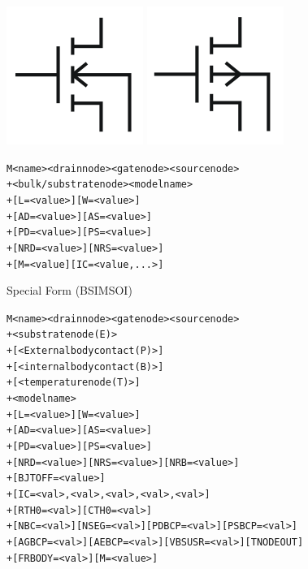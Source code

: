 


\begin{Device}\label{M_DEVICE}

\symbol
{\includegraphics{nmosSymbol}}
{\includegraphics{pmosSymbol}}

\device
\begin{alltt}
M<name> <drain node> <gate node> <source node>
+ <bulk/substrate node> <model name>
+ [L=<value>] [W=<value>]
+ [AD=<value>] [AS=<value>]
+ [PD=<value>] [PS=<value>]
+ [NRD=<value>] [NRS=<value>]
+ [M=<value] [IC=<value, ...>]
\end{alltt}

\vbox{\hrulefill}
\item[Special Form (BSIMSOI)]
\begin{alltt}
M<name> <drain node> <gate node> <source node>
+ <substrate node (E)>
+ [<External body contact (P)>]
+ [<internal body contact (B)>]
+ [<temperature node (T)>]
+ <model name>
+ [L=<value>] [W=<value>]
+ [AD=<value>] [AS=<value>]
+ [PD=<value>] [PS=<value>]
+ [NRD=<value>] [NRS=<value>] [NRB=<value>]
+ [BJTOFF=<value>]
+ [IC=<val>,<val>,<val>,<val>,<val>]
+ [RTH0=<val>] [CTH0=<val>]
+ [NBC=<val>] [NSEG=<val>] [PDBCP=<val>] [PSBCP=<val>]
+ [AGBCP=<val>] [AEBCP=<val>] [VBSUSR=<val>] [TNODEOUT]
+ [FRBODY=<val>] [M=<value>]
\end{alltt}
\vbox{\hrulefill}


\end{Device}
